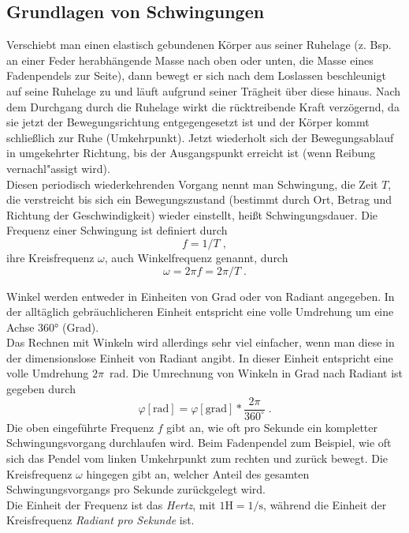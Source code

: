 \subsection{Grundlagen von Schwingungen}

Verschiebt man einen elastisch gebundenen Körper aus seiner Ruhelage (z. Bsp. an einer Feder herabhängende Masse nach oben oder unten, die Masse eines Fadenpendels zur Seite), dann bewegt er sich nach dem Loslassen beschleunigt auf seine Ruhelage zu und läuft aufgrund seiner Trägheit über diese hinaus. Nach dem Durchgang durch die Ruhelage wirkt die rücktreibende Kraft verzögernd, da sie jetzt der Bewegungsrichtung entgegengesetzt ist und der Körper kommt schließlich zur Ruhe (Umkehrpunkt). Jetzt wiederholt sich der Bewegungsablauf in umgekehrter Richtung, bis der Ausgangspunkt erreicht ist (wenn Reibung vernachl"assigt wird). \\
Diesen periodisch wiederkehrenden Vorgang nennt man Schwingung, die Zeit $T$, die verstreicht bis sich ein Bewegungszustand (bestimmt durch Ort, Betrag und Richtung der Geschwindigkeit) wieder einstellt, hei{\ss}t Schwingungsdauer. Die Frequenz einer Schwingung ist definiert durch
\begin{equation}
f = 1/T \; ,
\end{equation}
ihre Kreisfrequenz $\omega$, auch Winkelfrequenz genannt, durch
\begin{equation}
\omega = 2\pi f = 2\pi /T\; .
\end{equation}
%
\begin{hint}
Winkel werden entweder in Einheiten von Grad oder von Radiant angegeben. In der alltäglich gebräuchlicheren Einheit entspricht eine volle Umdrehung um eine Achse 360° (Grad).\\
Das Rechnen mit Winkeln wird allerdings sehr viel einfacher, wenn man diese in der dimensionslose Einheit von Radiant angibt. In dieser Einheit entspricht eine volle Umdrehung $2\pi$~rad. Die Umrechnung von Winkeln in Grad nach Radiant ist gegeben durch
\begin{equation}
	\varphi \mathrm{\left[rad\right]} = \varphi \mathrm{\left[grad\right]}*\frac{2\pi}{360^{\circ}} \; .
\end{equation}
Die oben eingeführte Frequenz $f$ gibt an, wie oft pro Sekunde ein kompletter Schwingungsvorgang durchlaufen wird. Beim Fadenpendel zum Beispiel, wie oft sich das Pendel vom linken Umkehrpunkt zum rechten und zurück bewegt. Die Kreisfrequenz $\omega$ hingegen gibt an, welcher Anteil des gesamten Schwingungsvorgangs pro Sekunde zurückgelegt wird.\\Die Einheit der Frequenz ist das \textit{Hertz}, mit $1 \mathrm{H} = 1/\mathrm{s}$, während die Einheit der Kreisfrequenz \textit{Radiant pro Sekunde} ist.
\end{hint}
